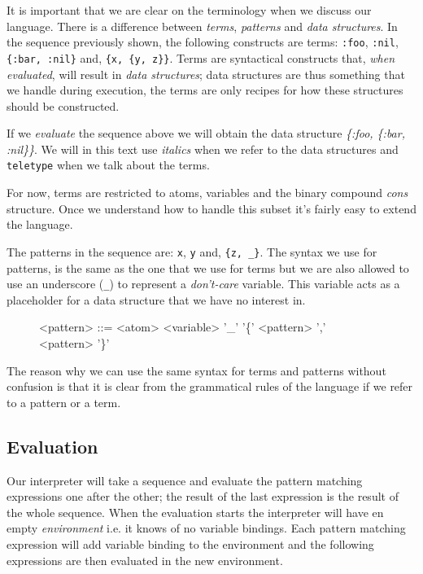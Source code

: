 \documentclass[a4paper,11pt]{article}
\begin{document}
It is important that we are clear on the terminology when we discuss
our language. There is a difference between {\em terms}, {\em
  patterns} and {\em data structures}. In the sequence previously
shown, the following constructs are terms: \verb+:foo+, \verb+:nil+,
\verb+{:bar, :nil}+ and, \verb+{x, {y, z}}+. Terms are syntactical
constructs that, {\em when evaluated}, will result in {\em data
  structures}; data structures are thus something that we handle
during execution, the terms are only recipes for how these structures
should be constructed.

If we {\em evaluate} the sequence above we will obtain the data
structure \textit{ \{:foo, \{:bar, :nil\}\}}. We will in this
text use {\it italics} when we refer to the data structures and
\verb+teletype+ when we talk about the terms.

For now, terms are restricted to atoms, variables and the binary
compound {\em cons} structure. Once we understand how to handle this
subset it's fairly easy to extend the language.

The patterns in the sequence are: \verb+x+, \verb+y+ and,
\verb+{z, _}+. The syntax we use for patterns, is the same as the one
that we use for terms but we are also allowed to use an underscore
(\verb+_+) to represent a {\em don't-care} variable. This variable
acts as a placeholder for a data structure that we have no interest
in.

\begin{figure}[h]
\begin{grammar}
<pattern> ::= <atom>
\alt <variable>
\alt '_'  
\alt '\{' <pattern> ',' <pattern> '\}'
\end{grammar}
\end{figure}

The reason why we can use the same syntax for terms and patterns
without confusion is that it is clear from the grammatical rules of the
language if we refer to a pattern or a term. 

\subsection{Evaluation}
Our interpreter will take a sequence and evaluate the pattern matching
expressions one after the other; the result of the last expression is
the result of the whole sequence. When the evaluation starts the
interpreter will have en empty {\em environment} i.e. it knows of no
variable bindings. Each pattern matching expression will add variable
binding to the environment and the following expressions are then
evaluated in the new environment.
 
\end{document}
